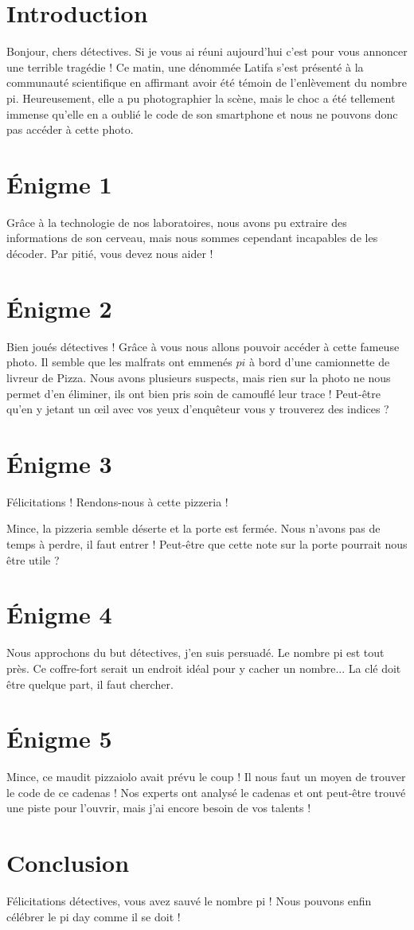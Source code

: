 \documentclass[12pt, parskip=half-]{scrartcl}
\begin{document}
\section*{Introduction}
Bonjour, chers détectives. Si je vous ai réuni aujourd'hui c'est pour vous annoncer une terrible tragédie ! Ce matin, une dénommée Latifa s'est présenté à la communauté scientifique en affirmant avoir été témoin de l'enlèvement du nombre pi. Heureusement, elle a pu photographier la scène, mais le choc a été tellement immense qu'elle en a oublié le code de son smartphone et nous ne pouvons donc pas accéder à cette photo.

\section*{Énigme 1}
Grâce à la technologie de nos laboratoires, nous avons pu extraire des informations de son cerveau, mais nous sommes cependant incapables de les décoder. Par pitié, vous devez nous aider !

\section*{Énigme 2}
Bien joués détectives ! Grâce à vous nous allons pouvoir accéder à cette fameuse photo. Il semble que les malfrats ont emmenés $pi$ à bord d'une camionnette de livreur de Pizza. Nous avons plusieurs suspects, mais rien sur la photo ne nous permet d'en éliminer, ils ont bien pris soin de camouflé leur trace ! Peut-être qu'en y jetant un \oe il avec vos yeux d'enquêteur vous y trouverez des indices ?

\section*{Énigme 3}
Félicitations ! Rendons-nous à cette pizzeria !

Mince, la pizzeria semble déserte et la porte est fermée. Nous n'avons pas de temps à perdre, il faut entrer ! Peut-être que cette note sur la porte pourrait nous être utile ? 

\section*{Énigme 4}
Nous approchons du but détectives, j'en suis persuadé. Le nombre pi est tout près. Ce coffre-fort serait un endroit idéal pour y cacher un nombre... La clé doit être quelque part, il faut chercher.

\section*{Énigme 5}
Mince, ce maudit pizzaiolo avait prévu le coup ! Il nous faut un moyen de trouver le code de ce cadenas ! Nos experts ont analysé le cadenas et ont peut-être trouvé une piste pour l'ouvrir, mais j'ai encore besoin de vos talents ! 

\section*{Conclusion}
Félicitations détectives, vous avez sauvé le nombre pi ! Nous pouvons enfin célébrer le pi day comme il se doit !
\end{document}
